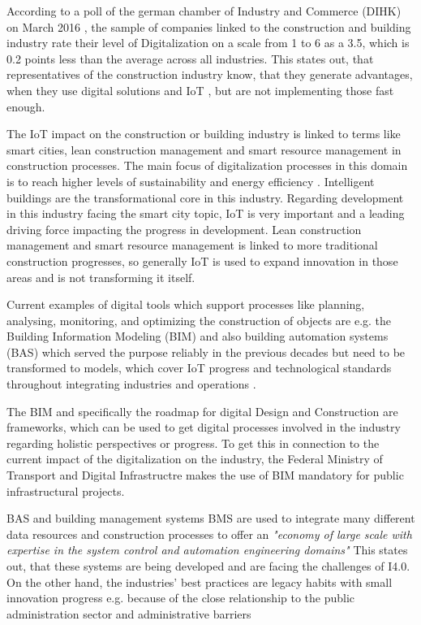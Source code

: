 
According to a poll of the german chamber of Industry and Commerce (\ac{DIHK}) on March 2016 \cite[]{barometer:2016}, the sample of companies linked to the construction and building industry rate their level of Digitalization on a scale from 1 to 6 as a 3.5, which is 0.2 points less than the average across all industries.\cite[p.5]{barometer:2016} This states out, that representatives of the construction industry know, that they generate advantages, when they use digital solutions and \ac{IoT} \cite[p.7-8]{barometer:2016}, but are not implementing those fast enough.

The \ac{IoT} impact on the construction or building industry is linked to terms like smart cities, lean construction management and smart resource management in construction processes. The main focus of digitalization processes in this domain is to reach higher levels of sustainability and energy efficiency \cite{Lilis2017473}.
Intelligent buildings are the transformational core in this industry. Regarding development in this industry facing the smart city topic, \ac{IoT} is very important and a leading driving force impacting the progress in development. Lean construction management and smart resource management is linked to more traditional construction progresses, so generally \ac{IoT} is used to expand innovation in those areas and is not transforming it itself.

Current examples of digital tools which support processes like planning, analysing, monitoring, and optimizing the construction of objects are e.g. the Building Information Modeling (\ac{BIM}) and also building automation systems (\ac{BAS}) which served the purpose reliably in the previous decades but need to be transformed to models, which cover \ac{IoT} progress and technological standards throughout integrating industries and operations \cite{Lilis2017473}.

The \ac{BIM} and specifically the roadmap for digital Design and Construction \cite{FederalMinRoadMapConstruction}
are frameworks, which can be used to get digital processes involved in the industry regarding holistic perspectives or progress. To get this in connection to the current impact of the digitalization on the industry, the Federal Ministry of Transport and Digital Infrastructre makes the use of BIM mandatory for public infrastructural projects.\cite{FederalMinRoadMapConstruction}

\ac{BAS} and building management systems \ac{BMS} are used to integrate many different data resources and construction processes to offer an \emph{"economy of large scale with expertise in the system control and automation engineering domains"} \cite[p.475]{Lilis2017473} %
This states out, that these systems are being developed and are facing the challenges of \ac{I4.0}. On the other hand, the industries' best practices are legacy habits with small innovation progress e.g. because of the close relationship to the public administration sector and administrative barriers \cite{Oesterreich2016121}

